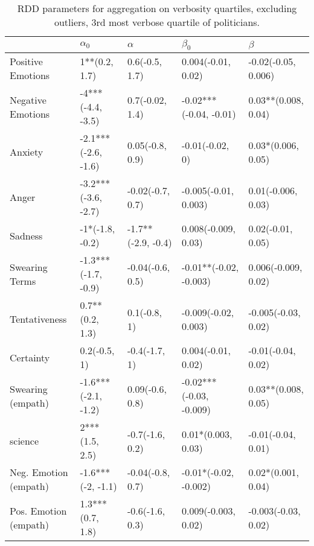\begin{table}[h]\centering
\begin{adjustbox}{width=\linewidth, center}
	\begin{tabular}{lllll}
	\toprule
	{} &           $\alpha_0$ &            $\alpha$ &                $\beta_0$ &              $\beta$ \\
	\midrule
	Positive Emotions     &        1**(0.2, 1.7) &      0.6(-0.5, 1.7) &       0.004(-0.01, 0.02) &  -0.02(-0.05, 0.006) \\
	Negative Emotions     &    -4***(-4.4, -3.5) &     0.7(-0.02, 1.4) &   -0.02***(-0.04, -0.01) &  0.03**(0.008, 0.04) \\
	Anxiety               &  -2.1***(-2.6, -1.6) &     0.05(-0.8, 0.9) &          -0.01(-0.02, 0) &   0.03*(0.006, 0.05) \\
	Anger                 &  -3.2***(-3.6, -2.7) &    -0.02(-0.7, 0.7) &     -0.005(-0.01, 0.003) &   0.01(-0.006, 0.03) \\
	Sadness               &      -1*(-1.8, -0.2) &  -1.7**(-2.9, -0.4) &      0.008(-0.009, 0.03) &    0.02(-0.01, 0.05) \\
	Swearing Terms        &  -1.3***(-1.7, -0.9) &    -0.04(-0.6, 0.5) &   -0.01**(-0.02, -0.003) &  0.006(-0.009, 0.02) \\
	Tentativeness         &      0.7**(0.2, 1.3) &        0.1(-0.8, 1) &     -0.009(-0.02, 0.003) &  -0.005(-0.03, 0.02) \\
	Certainty             &         0.2(-0.5, 1) &       -0.4(-1.7, 1) &       0.004(-0.01, 0.02) &   -0.01(-0.04, 0.02) \\
	Swearing (empath)     &  -1.6***(-2.1, -1.2) &     0.09(-0.6, 0.8) &  -0.02***(-0.03, -0.009) &  0.03**(0.008, 0.05) \\
	science               &       2***(1.5, 2.5) &     -0.7(-1.6, 0.2) &       0.01*(0.003, 0.03) &   -0.01(-0.04, 0.01) \\
	Neg. Emotion (empath) &    -1.6***(-2, -1.1) &    -0.04(-0.8, 0.7) &    -0.01*(-0.02, -0.002) &   0.02*(0.001, 0.04) \\
	Pos. Emotion (empath) &     1.3***(0.7, 1.8) &     -0.6(-1.6, 0.3) &      0.009(-0.003, 0.02) &  -0.003(-0.03, 0.02) \\
	\bottomrule
	\end{tabular}
	
\end{adjustbox}
	\caption{RDD parameters for aggregation on verbosity quartiles, excluding outliers, 3rd most verbose quartile of politicians.}
	\label{fig: Verbosity_6}
\end{table}

